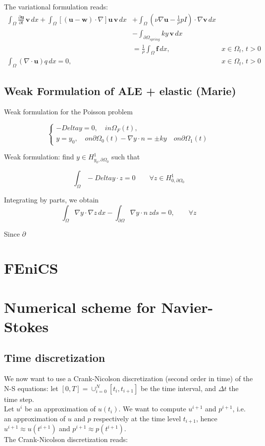 \documentclass[11pt,a4paper,titlepage]{report}
\begin{document}
The variational formulation reads:
\[
\begin{aligned}
\int_{\Omega} \frac{\partial \mathbf{u}}{\partial t} \, \mathbf{v} \, dx 
+ \int_{\Omega} [(\mathbf{u - w}) \cdot \nabla] \mathbf{u} \, \mathbf{v} \, dx
&+ \int_{\Omega} (\nu \nabla \mathbf{u} -  \frac{1}{\rho}  pI) \cdot \nabla \mathbf{v} \, dx \\
& - \int_{\partial \Omega_{spring}} ky \, \mathbf{v} \, dx \\
& =  \frac{1}{\rho} \int_{\Omega} \mathbf{f} \, dx,  & x \in \Omega_t, \, t>0 \\
\int_{\Omega} ( \nabla \cdot \mathbf{u} ) q \, dx = 0 , & & x \in \Omega_t, \, t>0
\end{aligned}
\]


\subsection{Weak Formulation of ALE + elastic (Marie)}
Weak formulation for the Poisson problem

\[
\left\{  
\begin{aligned}
-Delta y = 0, \quad in \Omega_F (t), \\
y = y_0,  \quad on \partial \Omega_0 (t)
- \nabla y \cdot n = \pm ky \quad on \partial \Omega_1 (t)
\end{aligned}
\right.
\]

Weak formulation: find $y \in H^1_{y_0, \partial \Omega_0}$ such that

\[
\int_\Omega -Delta y \cdot z = 0 \qquad \forall z \in H^1_{0, \partial \Omega_0}
\]

Integrating by parts, we obtain
\[
\int_\Omega \nabla y \cdot \nabla z \,  dx - \int_{\partial \Omega} \nabla y \cdot n \, z ds = 0, \qquad \forall z
\]

Since $\partial$






\section{FEniCS}
\section{Numerical scheme for Navier-Stokes}

\subsection{Time discretization}
We now want to use a Crank-Nicolson discretization (second order in time) of the N-S equations: let $[0, T] = \cup^N_{i=0} [t_i, t_{i+1}] $ be the time interval, and $\Delta t$ the time step. \\
Let $u^i$ be an approximation of $u(t_i)$. We want to compute $u^{i+1}$ and $p^{i+1}$, i.e. an approximation of $u$ and $p$ respectively at the time level $t_{i+1}$, hence $u^{i+1} \approx u(t^{i+1})$ and $p^{i+1} \approx p(t^{i+1})$. \\
The Crank-Nicolson discretization reads:
\end{document}
